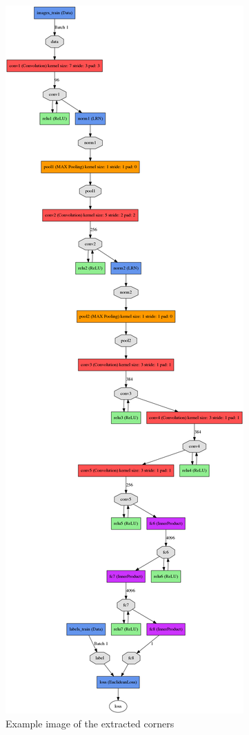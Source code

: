 \documentclass{article}
\begin{document}
\begin{figure}[h!]
  \includegraphics[width=0.9\linewidth]{ZF}
  \caption{Example image of the extracted corners}
  \label{fig:ex_corners}
\end{figure}
\end{document}
